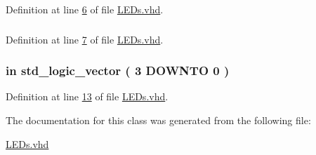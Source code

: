 Definition at line \hyperlink{_l_e_ds_8vhd_source_l00006}{6} of file \hyperlink{_l_e_ds_8vhd_source}{L\+E\+Ds.\+vhd}.

\hypertarget{class_l_e_ds_a598da929e807d58939b47499e8bc9fa8}{}
\subsubsection[{std\+\_\+logic\+\_\+unsigned}]{\hspace{0.3cm}{\ttfamily [Package]}}\label{class_l_e_ds_a598da929e807d58939b47499e8bc9fa8}


Definition at line \hyperlink{_l_e_ds_8vhd_source_l00007}{7} of file \hyperlink{_l_e_ds_8vhd_source}{L\+E\+Ds.\+vhd}.

\hypertarget{class_l_e_ds_a30974727c81621f672f7f9490463f9d3}{}
\subsubsection[{S\+W}]{ {\bfseries \textcolor{keywordflow}{in}\textcolor{vhdlchar}{ }} {\bfseries \textcolor{comment}{std\+\_\+logic\+\_\+vector}\textcolor{vhdlchar}{ }\textcolor{vhdlchar}{(}\textcolor{vhdlchar}{ }\textcolor{vhdlchar}{ } \textcolor{vhdldigit}{3} \textcolor{vhdlchar}{ }\textcolor{keywordflow}{D\+O\+W\+N\+T\+O}\textcolor{vhdlchar}{ }\textcolor{vhdlchar}{ } \textcolor{vhdldigit}{0} \textcolor{vhdlchar}{ }\textcolor{vhdlchar}{)}\textcolor{vhdlchar}{ }} \hspace{0.3cm}{\ttfamily [Port]}}\label{class_l_e_ds_a30974727c81621f672f7f9490463f9d3}


Definition at line \hyperlink{_l_e_ds_8vhd_source_l00013}{13} of file \hyperlink{_l_e_ds_8vhd_source}{L\+E\+Ds.\+vhd}.



The documentation for this class was generated from the following file\+:\begin{DoxyCompactItemize}
\item 
\hyperlink{_l_e_ds_8vhd}{L\+E\+Ds.\+vhd}\end{DoxyCompactItemize}
